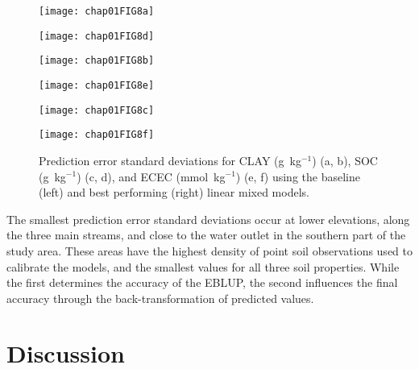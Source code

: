 \begin{figure}[!ht]
\centering
    \begin{minipage}[b]{63mm}
      \subcaption{}
      \label{fig:clay-base-var}
      \centering
      \texttt{[image: chap01FIG8a]}
    \end{minipage}
    \begin{minipage}[b]{63mm}
      \subcaption{}
      \label{fig:clay-best-var}
      \centering
      \texttt{[image: chap01FIG8d]}
    \end{minipage}
    \begin{minipage}[b]{63mm}
      \subcaption{}
      \label{fig:soc-base-var}
      \centering
      \texttt{[image: chap01FIG8b]}
    \end{minipage}
    \begin{minipage}[b]{63mm}
      \subcaption{}
      \label{fig:soc-best-var}
      \centering
      \texttt{[image: chap01FIG8e]}
    \end{minipage}
    \begin{minipage}[b]{63mm}
      \subcaption{}
      \label{fig:ecec-base-var}
      \centering
      \texttt{[image: chap01FIG8c]}
    \end{minipage}
    \begin{minipage}[b]{63mm}
      \subcaption{}
      \label{fig:ecec-best-var}
      \centering
      \texttt{[image: chap01FIG8f]}
    \end{minipage}
  \caption{Prediction error standard deviations for CLAY (g~kg$^{-1}$) (a, b), 
  SOC (g~kg$^{-1}$) (c, d), and ECEC (mmol~kg$^{-1}$) (e, f) using the baseline 
  (left) and best performing (right) linear mixed models.}
  \label{fig:kriging-variance}
\end{figure}

The smallest prediction error standard deviations occur at lower elevations, 
along the three main streams, and close to the water outlet in the southern 
part of the study area. These areas have the highest density of point soil 
observations used to calibrate the models, and the smallest values for all 
three soil properties. While the first determines the accuracy of the EBLUP, 
the second influences the final accuracy through the back-transformation of 
predicted values.

\section{Discussion}

